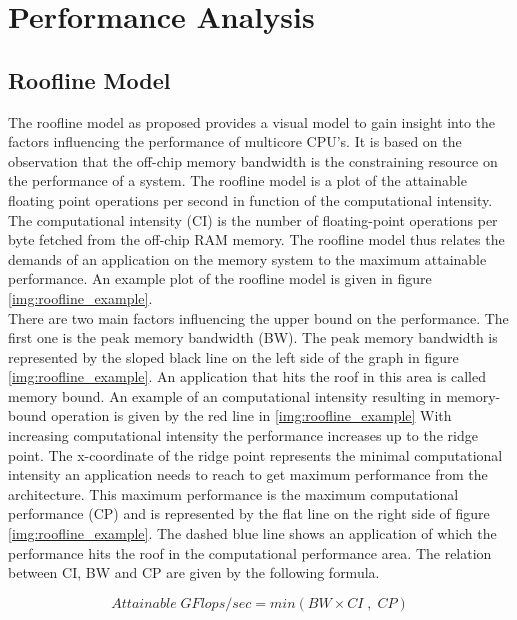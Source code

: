 
\chapter{Performance Analysis}

\section{Roofline Model}

The roofline model as proposed provides a visual model to gain insight into the factors influencing the performance of multicore CPU's.\cite{Williams:2009:RIV:1498765.1498785}
It is based on the observation that the off-chip memory bandwidth is the constraining resource on the performance of a system.\cite{patterson2004latency}  The roofline model is a plot of the attainable floating point operations per second in function of the computational intensity. The computational intensity (CI) is the number of floating-point operations per byte fetched from the off-chip RAM memory. The roofline model thus relates the demands of an application on the memory system to the maximum attainable performance.
An example plot of the roofline model is given in figure \ref{img:roofline_example}.\\

There are two main factors influencing the upper bound on the performance. The first one is the peak memory bandwidth (BW). The peak memory bandwidth is represented by the sloped black line on the left side of the graph in figure \ref{img:roofline_example}. An application that hits the roof in this area is called memory bound. An example of an computational intensity resulting in memory-bound operation is given by the red line in \ref{img:roofline_example} With increasing computational intensity the performance increases up to the ridge point. The x-coordinate of the ridge point represents the minimal computational intensity an application needs to reach to get maximum performance from the architecture. This maximum performance is the maximum computational performance (CP) and is represented by the flat line on the right side of figure \ref{img:roofline_example}. The dashed blue line shows an application of which the performance hits the roof in the computational performance area.
The relation between CI, BW and CP are given by the following formula.

\begin{equation}
Attainable\;GFlops/sec = min \left( BW \times CI \; , \; CP \right)
\end{equation}

